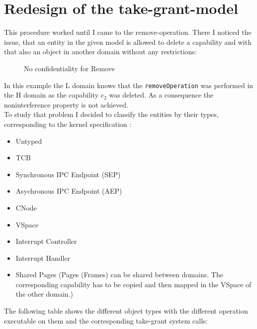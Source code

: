 \section{Redesign of the take-grant-model}
This procedure worked until I came to the remove-operation. There I noticed the issue, that an entity in the given model is allowed to delete a capability and with that also an object in another domain without any restrictions:
\begin{figure}[H]
\caption{No confidentiality for Remove}
\end{figure}
In this example the L domain knows that the \texttt{removeOperation} was performed in the H domain as the capability c$_2$ was deleted. As a consequence the noninterference property is not achieved. \\
To study that problem I decided to classify the entities by their types, corresponding to the kernel specification \cite{Manual}:
\begin{itemize}
\item Untyped 
\item TCB
\item Synchronous IPC Endpoint (SEP)
\item Asychronous IPC Endpoint (AEP)
\item CNode
\item VSpace
\item Interrupt Controller 
\item Interrupt Handler
\item Shared Pages (Pages (Frames) can be shared between domains. The corresponding capability has to be copied and then mapped in the VSpace of the other domain.)
\end{itemize}
The following table shows the different object types with the different operation executable on them and the corresponding take-grant system calls: 
